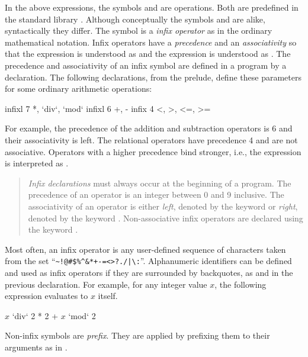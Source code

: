 In the above expressions, the symbols \ccode{+} and
 are operations.
Both are predefined in the standard library .
Although conceptually the symbols \ccode{+} and 
are alike, syntactically they differ.
The symbol \ccode{+} is a \emph{infix operator}
as in the ordinary mathematical notation.  
Infix operators have a \emph{precedence}
and an \emph{associativity}
so that the expression 
is understood as  and
the expression  is understood
as .
The precedence and associativity of an infix symbol
are defined in a program by a declaration.
The following declarations, from the prelude,
define these parameters for some ordinary arithmetic operations:
%
\begin{curry}
infixl 7 *, `div`, `mod`
infixl 6 +, -
infix  4  <, >, <=, >=
\end{curry}
%
For example, 
the precedence of the addition and subtraction operators is 6
and their associativity is left.
The relational operators have precedence 4 and are not associative.
Operators with a higher precedence bind stronger, i.e.,
the expression  is interpreted as
.
%
\begin{quote}
\emph{Infix declarations}
must always occur at the beginning of a program.
The precedence of an operator
is an integer between 0 and 9 inclusive.
The associativity of an operator is either
\emph{left}, denoted by the keyword 
or \emph{right}, denoted by the keyword .
Non-associative infix operators are declared using the 
keyword .
\end{quote}
%
Most often, an infix operator is any user-defined sequence of characters
taken from the set
``\verb`~!@#$%^&*+-=<>?./|\:`''.
Alphanumeric identifiers can be defined and used as infix operators
if they are surrounded by backquotes, as  and
 in the previous declaration.
For example, for any integer value $x$, the following expression
evaluates to $x$ itself.
%
\begin{prog}
$x$ `div` 2 * 2 + $x$ `mod` 2
\end{prog}
%
Non-infix symbols are \emph{prefix}.
They are applied by prefixing them to their arguments as in
.

